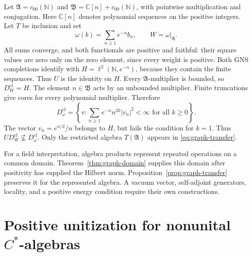 \documentclass[11pt]{article}
\numberwithin{equation}{section}
\newcommand{\C}{\mathbb C}
\begin{document}
\begin{example}
Let\label{ex:transfer-domain} $\mathfrak A=c_{00}(\mathbb N)$ and
$\mathfrak B=\C[n]+c_{00}(\mathbb N)$, with pointwise multiplication
and conjugation.  Here $\C[n]$ denotes polynomial sequences on the
positive integers.  Let $T$ be inclusion and set
\[
 \omega(b)=\sum_{n\geq1}e^{-n}b_n,
 \qquad W=\omega|_{\mathfrak A}.
\]
All sums converge, and both functionals are positive and faithful: their
square values are zero only on the zero element, since every weight is positive.
Both GNS completions identify with
$H=\ell^2(\mathbb N,e^{-n})$, because they contain the finite sequences.
Thus $U$ is the identity on $H$.
Every $\mathfrak A$-multiplier is bounded, so $D_W^{\mathrm{cl}}=H$.
The element $n\in\mathfrak B$ acts by an unbounded multiplier.
Finite truncations give cores for every polynomial multiplier.  Therefore
\[
 D_\omega^{\mathrm{cl}}
 =\left\{v:\sum_{n\geq1}e^{-n}n^{2k}|v_n|^2<\infty
               \text{ for all }k\geq0\right\}.
\]
The vector $v_n=e^{n/2}/n$ belongs to $H$, but fails the condition for
$k=1$.  Thus $U D_W^{\mathrm{cl}}\nsubseteq D_\omega^{\mathrm{cl}}$.
Only the restricted algebra $T(\mathfrak A)$ appears in
\eqref{eq:graph-transfer}.
\end{example}

For a field interpretation, algebra products represent repeated operations
on a common domain.  Theorem~\ref{thm:graph-domain} supplies this domain
after positivity has supplied the Hilbert norm.
Proposition~\ref{prop:graph-transfer} preserves it for the represented
algebra.  A vacuum vector, self-adjoint generators, locality, and a positive
energy condition require their own constructions.

\section{Positive unitization for nonunital
\texorpdfstring{$C^*$}{C-star}-algebras}
\end{document}
